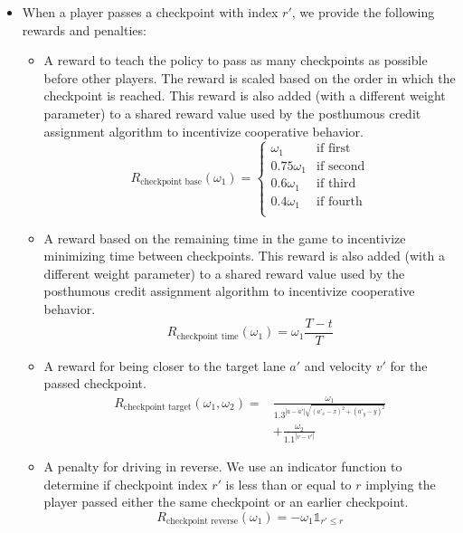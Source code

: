 \begin{itemize}
\item When a player passes a checkpoint with index $r'$, we provide the following rewards and penalties:
\begin{itemize}
    \item A reward to teach the policy to pass as many checkpoints as possible before other players. The reward is scaled based on the order in which the checkpoint is reached. This reward is also added (with a different weight parameter) to a shared reward value used by the posthumous credit assignment algorithm to incentivize cooperative behavior. 
    \begin{equation*}
        R_{\text{checkpoint base}}(\omega_1) = 
        \begin{cases}
            \omega_1 & \text{if first} \\
            0.75\omega_1 & \text{if second} \\
            0.6\omega_1 & \text{if third} \\
            0.4\omega_1 & \text{if fourth} \\
        \end{cases}
    \end{equation*}
    \item A reward based on the remaining time in the game to incentivize minimizing time between checkpoints. This reward is also added (with a different weight parameter) to a shared reward value used by the posthumous credit assignment algorithm to incentivize cooperative behavior. 
    \begin{equation*}
        R_{\text{checkpoint time}}(\omega_1) = \omega_1\frac{T-t}{T}
    \end{equation*}
    \item A reward for being closer to the target lane $a'$ and velocity $v'$ for the passed checkpoint.
    \begin{align*}
        R_{\text{checkpoint target}}(\omega_1, \omega_2) = & \frac{\omega_1}{1.3^{|a-a'|\sqrt{(a'_x-x)^2+(a'_y-y)^2}}} \\
        & + \frac{\omega_2}{1.1^{|v-v'|}}
       \end{align*}
    \item A penalty for driving in reverse. We use an indicator function to determine if checkpoint index $r'$ is less than or equal to $r$ implying the player passed either the same checkpoint or an earlier checkpoint.
    \begin{equation*}
        R_{\text{checkpoint reverse}}(\omega_1) = -\omega_1\mathds{1}_{r' \leq r}
    \end{equation*}
\end{itemize}
\end{itemize}

